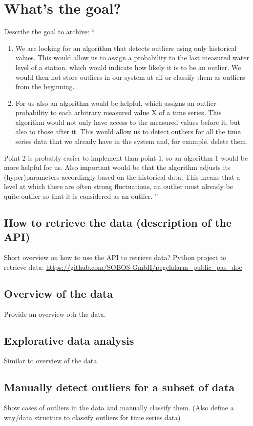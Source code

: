 \section{What's the goal?}
Describe the goal to archive: \newline
``
\begin{enumerate}
    \item We are looking for an algorithm that detects outliers using only historical values. This would allow us to assign a probability to the last measured water level of a station, which would indicate how likely it is to be an outlier. We would then not store outliers in our system at all or classify them as outliers from the beginning.
    \item For us also an algorithm would be helpful, which assigns an outlier probability to each arbitrary measured value X of a time series. This algorithm would not only have access to the measured values before it, but also to those after it. This would allow us to detect outliers for all the time series data that we already have in the system and, for example, delete them.

\end{enumerate}
Point 2 is probably easier to implement than point 1, so an algorithm 1 would be more helpful for us. 
Also important would be that the algorithm adjusts its (hyper)parameters accordingly based on the historical data. This means that a level at which there are often strong fluctuations, an outlier must already be quite outlier so that it is considered as an outlier.
''
\subsection{How to retrieve the data (description of the API)}
Short overview on how to use the API to retrieve data? Python project to retrieve data: \url{https://github.com/SOBOS-GmbH/pegelalarm_public_pas_doc}
\subsection{Overview of the data}
Provide an overview oth the data.
\subsection{Explorative data analysis}
Similar to overview of the data
\subsection{Manually detect outliers for a subset of data}
Show cases of outliers in the data and manually classify them. (Also define a way/data structure to classify outliers for time series data)
